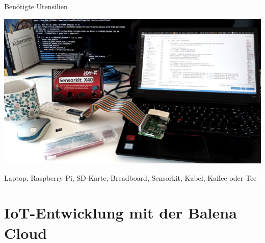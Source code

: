 \begin{frame}{Benötigte Utensilien}
    \begin{center}
        \includegraphics[width=\textwidth]{img/utensilien}
    \end{center}

    \footnotesize
    Laptop, Raspberry Pi, SD-Karte, Breadboard, Sensorkit, Kabel, Kaffee oder Tee
\end{frame}

\section{IoT-Entwicklung mit der Balena Cloud}

